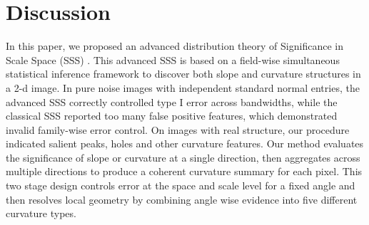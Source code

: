 \documentclass{article}
\begin{document}
\section{Discussion}
\label{sec_discussion}
In this paper, we proposed an advanced distribution theory of Significance in Scale Space (SSS) \citet{godtliebsen2002significance_cluster,godtliebsen2002significance,godtliebsen2004statistical}. This advanced SSS is based on a field-wise simultaneous statistical inference framework to discover both slope and curvature structures in a 2-d image. In pure noise images  with independent standard normal entries, the advanced SSS correctly controlled type I error across bandwidths, while the classical SSS reported too many false positive features, which demonstrated invalid family-wise error control. On images with real structure, our procedure indicated salient peaks, holes and other curvature features. Our method evaluates the significance of slope or curvature at a single direction, then aggregates across multiple directions to produce a coherent curvature summary for each pixel. This two stage design controls error at the space and scale level for a fixed angle and then resolves local geometry by combining angle wise evidence into five different curvature types.
\end{document}
